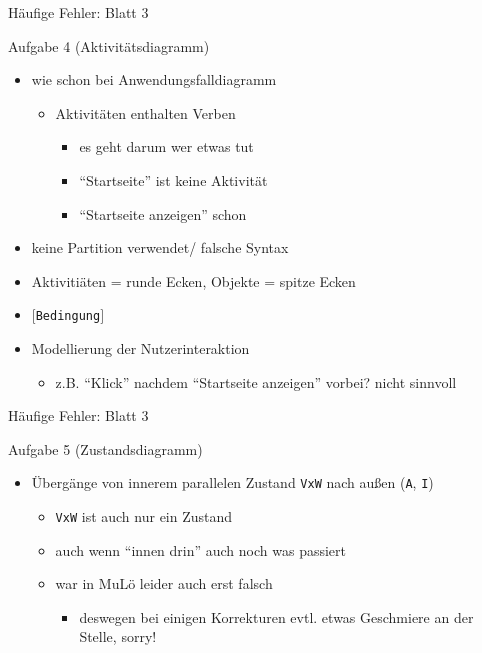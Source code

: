 \documentclass[18pt]{beamer}
\begin{document}
\begin{frame}{Häufige Fehler: Blatt 3}
\begin{block}{Aufgabe 4 (Aktivitätsdiagramm)}
	\begin{itemize}
	\pause 
	\item wie schon bei Anwendungsfalldiagramm
	\begin{itemize}
		\item Aktivitäten enthalten Verben
		\begin{itemize}
			\item es geht darum wer etwas tut
			\item \enquote{Startseite} ist keine Aktivität
			\item \enquote{Startseite anzeigen} schon
		\end{itemize}
	\end{itemize} \pause
	\item keine Partition verwendet/ falsche Syntax \pause
	\item Aktivitiäten = runde Ecken, Objekte = spitze Ecken \pause
	\item $\lbrack$\texttt{Bedingung}$\rbrack$ \pause
	\item Modellierung der Nutzerinteraktion
	\begin{itemize}
		\item z.B. \enquote{Klick} nachdem \enquote{Startseite anzeigen} vorbei? nicht sinnvoll
	\end{itemize}
	\end{itemize}
	\end{block}
\end{frame}

\begin{frame}{Häufige Fehler: Blatt 3}
	\begin{block}{Aufgabe 5 (Zustandsdiagramm)}
		\begin{itemize}
			\pause
			\item Übergänge von innerem parallelen Zustand \texttt{VxW} nach außen (\texttt{A}, \texttt{I})
			\begin{itemize}
				\item \texttt{VxW} ist auch nur ein Zustand
				\item auch wenn \enquote{innen drin} auch noch was passiert
				\item war in MuLö leider auch erst falsch
				\begin{itemize}
					\item deswegen bei einigen Korrekturen evtl. etwas Geschmiere an der Stelle, sorry!
				\end{itemize}
			\end{itemize}
		\end{itemize}
	\end{block}
\end{frame} 
\end{document}
